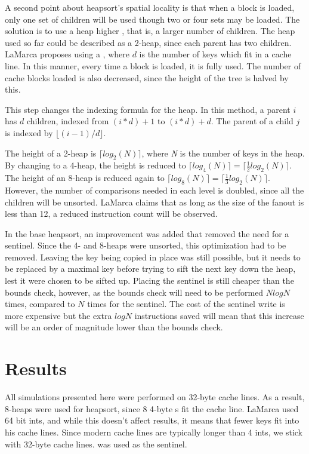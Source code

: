 A second point about heapsort's spatial locality is that when a block is loaded,
only one set of children will be used though two or four sets may be loaded. The
solution is to use a heap higher , that is, a larger number of
children.  The heap used so far could be described as a 2-heap, since each
parent has two children.  LaMarca proposes using a , where $d$ is the
number of keys which fit in a cache line. In this manner, every time a block is
loaded, it is fully used. The number of cache blocks loaded is also decreased,
since the height of the tree is halved by this.

This step changes the indexing formula for the heap. In this method, a parent
$i$ has $d$ children, indexed from $(i*d) + 1$ to $(i*d) + d$. The parent of a
child $j$ is indexed by $\lfloor{}(i-1)/d\rfloor{}$.

The height of a 2-heap is $\lceil{}log_2(N)\rceil{}$, where \textit{N} is the
number of keys in the heap. By changing to a 4-heap, the height is reduced to
$\lceil{}log_4(N)\rceil{} = \lceil{}\tfrac{1}{2}log_2(N)\rceil{}$. The height of
an 8-heap is reduced again to $\lceil{}log_8(N)\rceil{} =
\lceil{}\tfrac{1}{3}log_2(N)\rceil{}$. However, the number of comparisons needed
in each level is doubled, since all the children will be unsorted. LaMarca
claims that as long as the size of the fanout is less than 12, a reduced
instruction count will be observed.

In the base heapsort, an improvement was added that removed the need for a
sentinel. Since the 4- and 8-heaps were unsorted, this optimization had to be
removed. Leaving the key being copied in place was still possible, but it needs
to be replaced by a maximal key before trying to sift the next key down the
heap, lest it were chosen to be sifted up. Placing the sentinel is still cheaper
than the bounds check, however, as the bounds check will need to be performed
$NlogN$ times, compared to $N$ times for the sentinel. The cost of the sentinel
write is more expensive but the extra $logN$ instructions saved will mean that
this increase will be an order of magnitude lower than the bounds check.

\section{Results}
All simulations presented here were performed on 32-byte cache lines. As a
result, 8-heaps were used for heapsort, since 8 4-byte s fit the cache
line.  LaMarca used 64 bit ints, and while this doesn't affect results, it means
that fewer keys fit into his cache lines. Since modern cache lines are typically
longer than 4 ints, we stick with 32-byte cache lines.  was used
as the sentinel.

